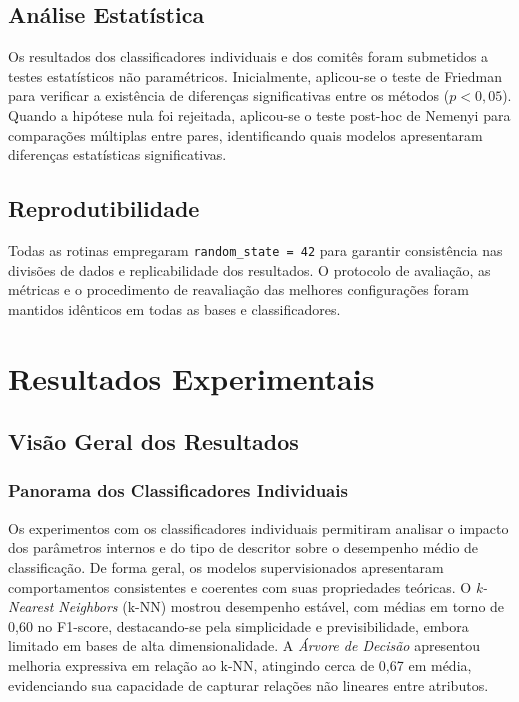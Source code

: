 \documentclass[12pt]{article}
\begin{document}
\subsection{Análise Estatística}

Os resultados dos classificadores individuais e dos comitês foram submetidos a testes estatísticos não paramétricos. Inicialmente, aplicou-se o teste de Friedman para verificar a existência de diferenças significativas entre os métodos (\(p < 0{,}05\)). Quando a hipótese nula foi rejeitada, aplicou-se o teste post-hoc de Nemenyi para comparações múltiplas entre pares, identificando quais modelos apresentaram diferenças estatísticas significativas.

\subsection{Reprodutibilidade}

Todas as rotinas empregaram \texttt{random\_state = 42} para garantir consistência nas divisões de dados e replicabilidade dos resultados. O protocolo de avaliação, as métricas e o procedimento de reavaliação das melhores configurações foram mantidos idênticos em todas as bases e classificadores.



\section{Resultados Experimentais}

\subsection{Visão Geral dos Resultados}

\subsubsection{Panorama dos Classificadores Individuais}

Os experimentos com os classificadores individuais permitiram analisar o impacto dos parâmetros internos e do tipo de descritor sobre o desempenho médio de classificação. De forma geral, os modelos supervisionados apresentaram comportamentos consistentes e coerentes com suas propriedades teóricas. O \textit{k-Nearest Neighbors} (k-NN) mostrou desempenho estável, com médias em torno de 0,60 no F1-score, destacando-se pela simplicidade e previsibilidade, embora limitado em bases de alta dimensionalidade. A \textit{Árvore de Decisão} apresentou melhoria expressiva em relação ao k-NN, atingindo cerca de 0,67 em média, evidenciando sua capacidade de capturar relações não lineares entre atributos.
\end{document}
